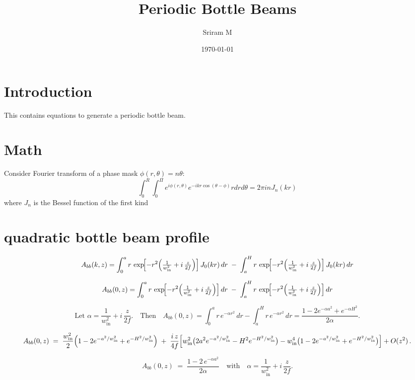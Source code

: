 \documentclass[11pt]{article}
\title{Periodic Bottle Beams}
\author{Sriram M}
\date{\today}
\begin{document}
\maketitle

\section{Introduction}

This contains equations to generate a periodic bottle beam.

\section{Math}
Consider Fourier transform of a phase mask \(\phi(r,\theta) = n \theta\):
\begin{equation}
\int_{0}^{R}\int_{0}^{\Pi} e^{i \phi(r,\theta)} e^{-i k r \cos(\theta - \phi)} r dr d\theta = 2\pi i n J_n(kr)
\end{equation}
where \(J_n\) is the Bessel function of the first kind



\section{quadratic bottle beam profile}
$$
A_{bb}(k,z) = \int_{0}^{a} r\,\exp\!\Bigl[-r^2\Bigl(\tfrac{1}{w_{\mathrm{in}}^2} + i\,\tfrac{z}{2f}\Bigr)\Bigr]\,J_0(kr)\,dr
\;-\;
\int_{a}^{H} r\,\exp\!\Bigl[-r^2\Bigl(\tfrac{1}{w_{\mathrm{in}}^2} + i\,\tfrac{z}{2f}\Bigr)\Bigr]\,J_0(kr)\,dr
$$

$$
A_{bb}(0,z) = \int_{0}^{a} r\,\exp\!\Bigl[-r^2\Bigl(\tfrac{1}{w_{\mathrm{in}}^2} + i\,\tfrac{z}{2f}\Bigr)\Bigr]\,dr
\;-\;
\int_{a}^{H} r\,\exp\!\Bigl[-r^2\Bigl(\tfrac{1}{w_{\mathrm{in}}^2} + i\,\tfrac{z}{2f}\Bigr)\Bigr]\,dr
$$

$$
\text{Let }\alpha = \frac{1}{w_{\mathrm{in}}^2} + i\,\frac{z}{2f}.
\quad\text{Then}
\quad
A_{bb}(0,z)
= \int_{0}^{a} r\,e^{-\alpha r^2}\,dr
  - \int_{a}^{H} r\,e^{-\alpha r^2}\,dr
= \frac{1 - 2e^{-\alpha a^2} + e^{-\alpha H^2}}{2\alpha}.
$$

$$
A_{bb}(0,z)
\;=\;
\frac{w_{\mathrm{in}}^2}{2}\Bigl(1 - 2e^{-a^2/w_{\mathrm{in}}^2} + e^{-H^2/w_{\mathrm{in}}^2}\Bigr)
\;+\;
\frac{i\,z}{4f}\Bigl[
w_{\mathrm{in}}^2\bigl(2a^2e^{-a^2/w_{\mathrm{in}}^2}-H^2e^{-H^2/w_{\mathrm{in}}^2}\bigr)
- w_{\mathrm{in}}^4\bigl(1 - 2e^{-a^2/w_{\mathrm{in}}^2} + e^{-H^2/w_{\mathrm{in}}^2}\bigr)
\Bigr]
+ O(z^2)\,.
$$

$$
A_{bb}(0,z)
\;=\;
\frac{1 - 2\,e^{-\alpha a^2}}{2\alpha}
\quad\text{with}\quad
\alpha = \frac{1}{w_{\mathrm{in}}^2} + i\,\frac{z}{2f}.
$$
\end{document}
